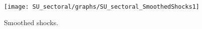  
\begin{figure}[H]
\centering 
\texttt{[image: SU\_sectoral/graphs/SU\_sectoral\_SmoothedShocks1]}
\caption{Smoothed shocks.}\label{Fig:SmoothedShocks:1}
\end{figure}


